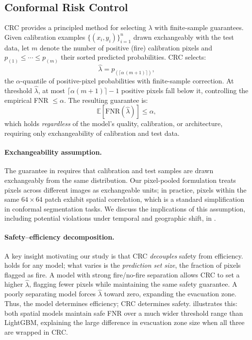 \documentclass{article}
\begin{document}
\subsection{Conformal Risk Control}
\label{sec:crc-background}

CRC \citep{angelopoulos2022conformal} provides a principled method for selecting $\lambda$ with finite-sample guarantees.
Given calibration examples $\{(x_i, y_i)\}_{i=1}^{n}$ drawn exchangeably with the test data, let $m$ denote the number of positive (fire) calibration pixels and $p_{(1)} \le \cdots \le p_{(m)}$ their sorted predicted probabilities.  CRC selects:
\begin{equation}
    \hat{\lambda} = p_{(\lceil \alpha\,(m+1) \rceil)},
    \label{eq:crc}
\end{equation}
the $\alpha$-quantile of positive-pixel probabilities with finite-sample correction.
At threshold $\hat{\lambda}$, at most $\lceil \alpha(m{+}1) \rceil - 1$ positive pixels fall below it, controlling the empirical FNR $\le \alpha$.
The resulting guarantee is:
\begin{equation}
    \mathbb{E}[\mathrm{FNR}(\hat{\lambda})] \le \alpha,
    \label{eq:guarantee}
\end{equation}
which holds \emph{regardless} of the model's quality, calibration, or architecture, requiring only exchangeability of calibration and test data.

\paragraph{Exchangeability assumption.}
The guarantee in  requires that calibration and test samples are drawn exchangeably from the same distribution.
Our pixel-pooled formulation treats pixels across different images as exchangeable units; in practice, pixels within the same $64{\times}64$ patch exhibit spatial correlation, which is a standard simplification in conformal segmentation tasks.
We discuss the implications of this assumption, including potential violations under temporal and geographic shift, in .

\paragraph{Safety--efficiency decomposition.}
A key insight motivating our study is that CRC \emph{decouples} safety from efficiency.
 holds for any model; what varies is the \emph{prediction set size}, the fraction of pixels flagged as fire.
A model with strong fire/no-fire separation allows CRC to set a higher $\hat{\lambda}$, flagging fewer pixels while maintaining the same safety guarantee.
A poorly separating model forces $\hat{\lambda}$ toward zero, expanding the evacuation zone.
Thus, the model determines efficiency; CRC determines safety.
 illustrates this: both spatial models maintain safe FNR over a much wider threshold range than LightGBM, explaining the large difference in evacuation zone size when all three are wrapped in CRC.
\end{document}
